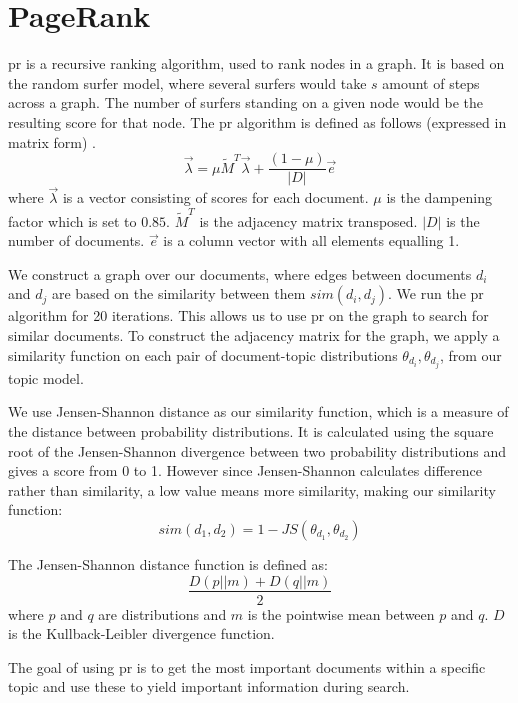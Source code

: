 \section{PageRank}\label{sec:pagerank}
\gls{pr} is a recursive ranking algorithm, used to rank nodes in a graph.
It is based on the random surfer model, where several surfers would take $s$ amount of steps across a graph.
The number of surfers standing on a given node would be the resulting score for that node.
The \gls{pr} algorithm is defined as follows (expressed in matrix form) \cite{ClusterPageRank}.
$$ \overrightarrow{\lambda} = \mu \widetilde{M}^T \overrightarrow{\lambda} + \frac{(1-\mu)}{|D|} \overrightarrow{e} $$  
where $\overrightarrow{\lambda}$ is a vector consisting of scores for each document. 
$\mu$ is the dampening factor which is set to $0.85$.
$\widetilde{M}^T$ is the adjacency matrix transposed.
$|D|$ is the number of documents.
$\overrightarrow{e}$ is a column vector with all elements equalling 1.

We construct a graph over our documents, where edges between documents $d_i$ and $d_j$ are based on the similarity between them $sim(d_i, d_j)$.
We run the \gls{pr} algorithm for 20 iterations.
This allows us to use \gls{pr} on the graph to search for similar documents.
To construct the adjacency matrix for the graph, we apply a similarity function on each pair of document-topic distributions $\theta_{d_i}, \theta_{d_j}$, from our topic model.

We use Jensen-Shannon distance as our similarity function, which is a measure of the distance between probability distributions\cite{jensen-shannon2003}\cite{jensen-shannondis2003}.
It is calculated using the square root of the Jensen-Shannon divergence between two probability distributions and gives a score from 0 to 1.
However since Jensen-Shannon calculates difference rather than similarity, a low value means more similarity, making our similarity function:
$$sim(d_1, d_2) = 1 - JS(\theta_{d_1}, \theta_{d_2})$$

The Jensen-Shannon distance function is defined as:
$$ \frac{D(p || m) + D(q || m)}{2}$$
where $p$ and $q$ are distributions and $m$ is the pointwise mean between $p$ and $q$. 
$D$ is the Kullback-Leibler divergence function.

The goal of using \gls{pr} is to get the most important documents within a specific topic and use these to yield important information during search.  
